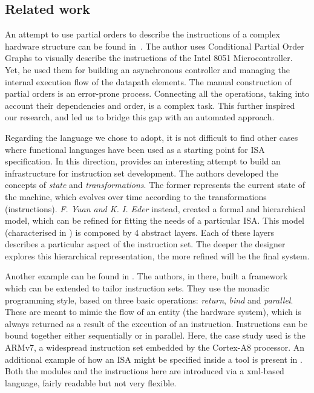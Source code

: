\documentclass[conference]{IEEEtran}
\begin{document}
\subsection{Related work}

An attempt to use partial orders to describe the instructions of a complex hardware
structure can be found in~\cite{maxPhd}. The author uses Conditional Partial Order
Graphs to visually describe the instructions of the Intel 8051 Microcontroller.
Yet, he used them for building an asynchronous controller and managing the internal
execution flow of the datapath elements. The manual construction of partial orders
is an error-prone process. Connecting all the operations, taking into account their
dependencies and order, is a complex task. This further inspired our research, and
led us to bridge this gap with an automated approach.

Regarding the language we chose to adopt, it is not difficult to find other cases
where functional languages have been used as a starting point for ISA
specification. In this direction, \cite{isaFunc} provides an interesting attempt to
build an infrastructure for instruction set development. The authors developed the
concepts of \textit{state} and \textit{transformations}. The former represents the
current state of the machine, which evolves over time according to the
transformations (instructions). \textit{F. Yuan and K. I. Eder} instead, created a
formal and hierarchical model, which can be refined for fitting the needs of a
particular ISA. This model (characterised in \cite{isaEventB}) is composed by 4
abstract layers. Each of these layers describes a particular aspect of the
instruction set. The deeper the designer explores this hierarchical representation,
the more refined will be the final system.

Another example can be found in \cite{armv7}. The authors, in there, built a framework
which can be extended to tailor instruction sets. They use the monadic programming
style, based on three basic operations: \textit{return}, \textit{bind} and
\textit{parallel}. These are meant to mimic the flow of an entity (the hardware
system), which is always returned as a result of the execution of an instruction.
Instructions can be bound together either sequentially or in parallel. Here, the
case study used is the ARMv7, a widespread instruction set embedded by the 
Cortex-A8 processor. An additional example of how an ISA might be specified inside
a tool is present in \cite{isaXml}. Both the modules and the instructions here are
introduced via a xml-based language, fairly readable but not very flexible.
\end{document}
